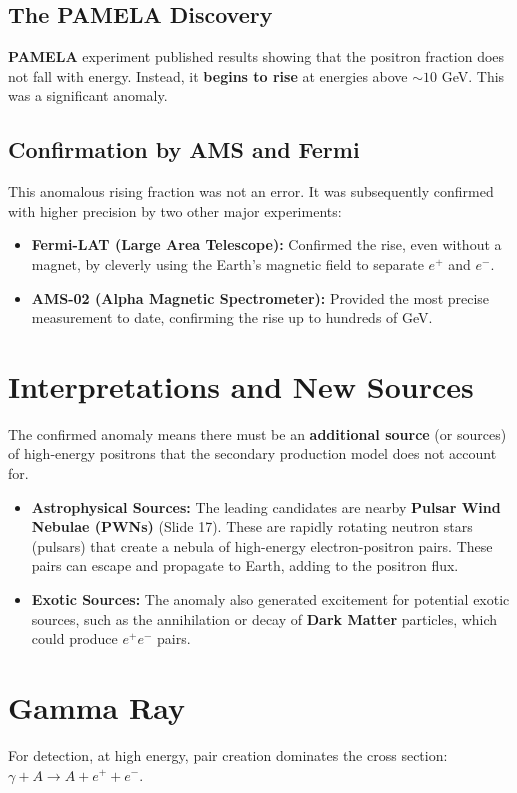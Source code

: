 \documentclass{sciposter}
\begin{document}
\begin{multicols}{3}
\subsection{The PAMELA Discovery}
\textbf{PAMELA}  experiment published results showing that the positron fraction does not fall with energy. Instead, it \textbf{begins to rise} at energies above $\sim 10$ GeV. This was a significant anomaly.

\subsection{Confirmation by AMS and Fermi}
This anomalous rising fraction was not an error. It was subsequently confirmed with higher precision by two other major experiments:
\begin{itemize}
    \item \textbf{Fermi-LAT (Large Area Telescope):} Confirmed the rise, even without a magnet, by cleverly using the Earth's magnetic field to separate $e^+$ and $e^-$.
    \item \textbf{AMS-02 (Alpha Magnetic Spectrometer):} Provided the most precise measurement to date, confirming the rise up to hundreds of GeV.
\end{itemize}

\section{Interpretations and New Sources}
The confirmed anomaly means there must be an \textbf{additional source} (or sources) of high-energy positrons that the secondary production model does not account for.

\begin{itemize}
    \item \textbf{Astrophysical Sources:} The leading candidates are nearby \textbf{Pulsar Wind Nebulae (PWNs)} (Slide 17). These are rapidly rotating neutron stars (pulsars) that create a nebula of high-energy electron-positron pairs. These pairs can escape and propagate to Earth, adding to the positron flux.
    \item \textbf{Exotic Sources:} The anomaly also generated excitement for potential exotic sources, such as the annihilation or decay of \textbf{Dark Matter} particles, which could produce $e^+ e^-$ pairs.
\end{itemize}


\section{Gamma Ray}
For detection, at high energy, pair creation dominates the cross section: $\gamma+A \rightarrow A+e^{+}+e^{-}  $.


\end{multicols}
\end{document}

